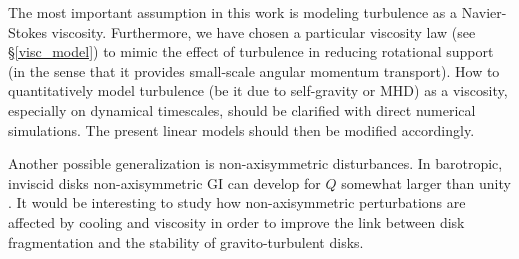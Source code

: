 The most important assumption in this work is modeling turbulence as a  
Navier-Stokes viscosity. Furthermore, we have chosen a particular  
viscosity law (see \S\ref{visc_model}) to mimic the effect of 
turbulence in reducing rotational support (in the sense that it
provides small-scale angular momentum transport). 
How to quantitatively model turbulence (be it due to self-gravity or
MHD) as a viscosity, especially on dynamical timescales, should be
clarified with direct numerical simulations. The present linear models
should then be modified accordingly. 

Another possible generalization is non-axisymmetric
disturbances. In barotropic, inviscid disks  
non-axisymmetric GI can develop for $Q$ somewhat larger than unity
\citep{papaloizou89,papaloizou91}. It would be interesting to study
how non-axisymmetric perturbations are affected by cooling and
viscosity in order to improve %
the link between disk fragmentation and the
stability of gravito-turbulent disks.   

